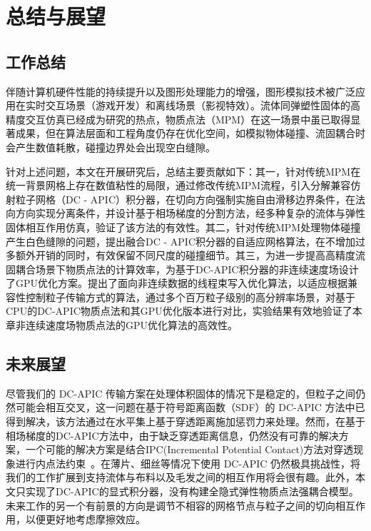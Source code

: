 \chapter{总结与展望}
\section{工作总结}
伴随计算机硬件性能的持续提升以及图形处理能力的增强，图形模拟技术被广泛应用在实时交互场景（游戏开发）和离线场景（影视特效）。流体同弹塑性固体的高精度交互仿真已经成为研究的热点，物质点法（MPM）在这一场景中虽已取得显著成果，但在算法层面和工程角度仍存在优化空间，如模拟物体碰撞、流固耦合时会产生数值耗散，碰撞边界处会出现空白缝隙。

针对上述问题，本文在开展研究后，总结主要贡献如下：其一，针对传统MPM在统一背景网格上存在数值粘性的局限，通过修改传统MPM流程，引入分解兼容仿射粒子网格（DC - APIC）积分器，在切向方向强制实施自由滑移边界条件，在法向方向实现分离条件，并设计基于相场梯度的分割方法，经多种复杂的流体与弹性固体相互作用仿真，验证了该方法的有效性。其二，针对传统MPM处理物体碰撞产生白色缝隙的问题，提出融合DC - APIC积分器的自适应网格算法，在不增加过多额外开销的同时，有效保留不同尺度的碰撞细节。其三，为进一步提高高精度流固耦合场景下物质点法的计算效率，为基于DC-APIC积分器的非连续速度场设计了GPU优化方案。提出了面向非连续数据的线程束写入优化算法，以适应根据兼容性控制粒子传输方式的算法，通过多个百万粒子级别的高分辨率场景，对基于CPU的DC-APIC物质点法和其GPU优化版本进行对比，实验结果有效地验证了本章非连续速度场物质点法的GPU优化算法的高效性。
\section{未来展望}
尽管我们的 DC-APIC 传输方案在处理体积固体的情况下是稳定的，但粒子之间仍然可能会相互交叉，这一问题在基于符号距离函数（SDF）的 DC-APIC 方法中已得到解决，该方法通过在水平集上基于穿透距离施加惩罚力来处理。然而，在基于相场梯度的DC-APIC方法中，由于缺乏穿透距离信息，仍然没有可靠的解决方案，一个可能的解决方案是结合IPC(Incremental Potential Contact)方法对穿透现象进行内点法约束~\cite{li2020incremental,lan2021medial,li2020codimensional,du2024embedded}。在薄片、细丝等情况下使用 DC-APIC 仍然极具挑战性，将我们的工作扩展到支持流体与布料以及毛发之间的相互作用将会很有趣。此外，本文只实现了DC-APIC的显式积分器，没有构建全隐式弹性物质点法强耦合模型。未来工作的另一个有前景的方向是调节不相容的网格节点与粒子之间的切向相互作用，以便更好地考虑摩擦效应。